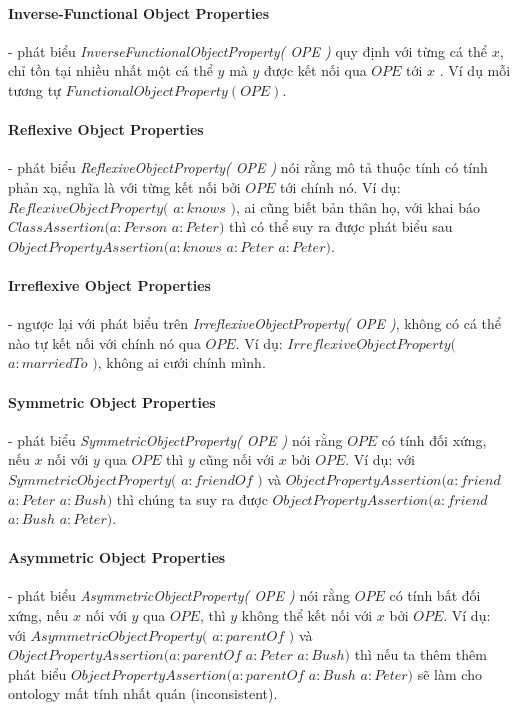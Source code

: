 \paragraph{Inverse-Functional Object Properties} - phát biểu \textit{InverseFunctionalObjectProperty( OPE )} quy định với từng cá thể $x$, chỉ tồn tại nhiều nhất một cá thể $y$ mà $y$ được kết nối qua $OPE$ tới $x$ . Ví dụ mỗi tương tự $FunctionalObjectProperty(OPE)$.

\paragraph{Reflexive Object Properties} - phát biểu \textit{ReflexiveObjectProperty( OPE )} nói rằng mô tả thuộc tính có tính phản xạ, nghĩa là với từng kết nối bởi $OPE$ tới chính nó. Ví dụ: $ReflexiveObjectProperty($ $a:knows$ $)$, ai cũng biết bản thân họ, với khai báo $ClassAssertion(a:Person$ $a:Peter)$ thì có thể suy ra được phát biểu sau $ObjectPropertyAssertion(a:knows$ $a:Peter$ $a:Peter)$.

\paragraph{Irreflexive Object Properties} - ngược lại với phát biểu trên  \textit{IrreflexiveObjectProperty( OPE )}, không có cá thể nào tự kết nối với chính nó qua $OPE$. Ví dụ: $IrreflexiveObjectProperty($ $a:marriedTo$ $)$, không ai cưới chính mình.

\paragraph{Symmetric Object Properties} - phát biểu \textit{SymmetricObjectProperty( OPE )} nói rằng $OPE$ có tính đối xứng, nếu $x$ nối với $y$ qua $OPE$ thì $y$ cũng nối với $x$ bởi $OPE$. Ví dụ: với $SymmetricObjectProperty($ $a:friendOf$ $)$ và $ObjectPropertyAssertion(a:friend$ $a:Peter$ $a:Bush)$ thì chúng ta suy ra được $ObjectPropertyAssertion(a:friend$ $a:Bush$ $a:Peter)$.

\paragraph{Asymmetric Object Properties} - phát biểu \textit{AsymmetricObjectProperty( OPE )} nói rằng $OPE$ có tính bất đối xứng, nếu $x$ nối với $y$ qua $OPE$, thì $y$ không thể kết nối với $x$ bởi $OPE$. Ví dụ: với $AsymmetricObjectProperty($ $a:parentOf$ $)$  và $ObjectPropertyAssertion(a:parentOf$ $a:Peter$ $a:Bush)$ thì nếu ta thêm thêm phát biểu $ObjectPropertyAssertion(a:parentOf$ $a:Bush$ $a:Peter)$ sẽ làm cho ontology mất tính nhất quán (inconsistent).

